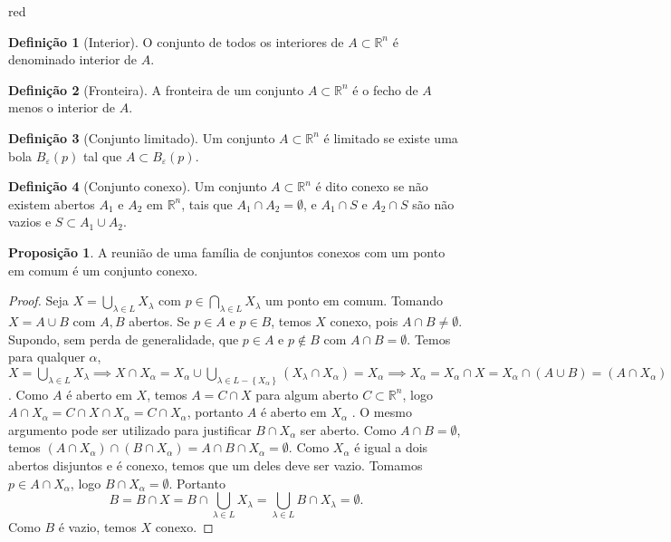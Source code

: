 \documentclass[12pt,leqno,twoside]{amsart}
\theoremstyle{definition}
\newtheorem{proposicao}{Proposição}[section]
\newtheorem{definicao}{Definição}[section]
\begin{document}
\begin{color}{red}
\begin{definicao}[Interior]
	O conjunto de todos os interiores de $A\subset \mathbb{R}^n$ é denominado interior de $A$.
\end{definicao}

\vspace{0.3cm}

\begin{definicao}[Fronteira]
	A fronteira de um conjunto $A\subset\mathbb{R}^n$ é o fecho de $A$ menos o interior de $A$.
\end{definicao}

\vspace{0.3cm}

\begin{definicao}[Conjunto limitado]
	Um conjunto $A\subset\mathbb{R}^n$ é limitado se existe uma bola $B_{\varepsilon}(p)$ tal que $A\subset B_{\varepsilon}(p)$.
\end{definicao}

\begin{definicao}[Conjunto conexo]
	Um conjunto $A\subset\mathbb{R}^n$ é dito conexo se não existem abertos $A_1$ e $A_2$ em $\mathbb{R}^n$, tais que $A_1 \cap A_2 = \emptyset$, e  $A_1\cap S$ e $A_2\cap S$ são não vazios e $S \subset A_1 \cup A_2$.
\end{definicao}

\vspace{0.3cm}

\begin{proposicao}
	A reunião de uma família de conjuntos conexos com um ponto em comum é um conjunto conexo.
\end{proposicao}
\begin{proof}
	Seja $X = \displaystyle\bigcup_{\lambda \in L} X_{\lambda}$ com $p\in \displaystyle\bigcap_{\lambda \in L} X_{\lambda}$ um ponto em comum. Tomando $X = A\cup B$ com $A,B$ abertos. Se $p\in A$ e $p\in B$, temos $X$ conexo, pois $A\cap B \neq \emptyset$. Supondo, sem perda de generalidade, que $p\in A$ e $p\not \in B$ com $A\cap B = \emptyset$. Temos  para qualquer $\alpha$, $X =   \displaystyle\bigcup_{\lambda \in L} X_{\lambda} \implies X\cap X_{\alpha} =  X_\alpha \cup \displaystyle\bigcup_{\lambda \in L - \left\{X_\alpha\right\}} \left(X_{\lambda} \cap X_\alpha\right) = X_{\alpha} \implies X_{\alpha} = X_{\alpha}\cap X = X_{\alpha}\cap\left(A\cup B\right) = \left( A\cap X_{\alpha}\right) \cup \left(B\cap X_{\alpha} \right) $. Como $A$ é aberto em $X$, temos $A = C\cap X$ para algum aberto $C\subset \mathbb{R}^n$, logo $A\cap X_{\alpha} = C\cap X\cap X_{\alpha} = C\cap X_{\alpha}$, portanto $A$ é aberto em $X_{\alpha}$ . O mesmo argumento pode ser utilizado para justificar $B\cap X_{\alpha}$ ser aberto. Como $A\cap B = \emptyset$, temos $(A\cap X_{\alpha})\cap (B\cap X_{\alpha}) = A\cap B \cap X_{\alpha} = \emptyset$. Como $X_{\alpha}$ é igual a dois abertos disjuntos e  é conexo,  temos que  um deles deve ser vazio. Tomamos $p\in A\cap X_{\alpha}$, logo $B \cap X_{\alpha} = \emptyset$. Portanto $$B = B\cap X = B\cap \bigcup_{\lambda \in L} X_{\lambda} =   \bigcup_{\lambda \in L} B\cap X_{\lambda} = \emptyset.$$
	Como $B$ é vazio, temos $X$ conexo.
\end{proof}


\end{color}
\end{document}
